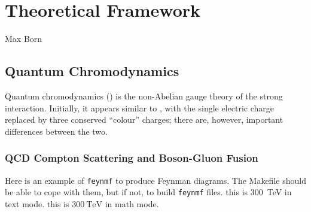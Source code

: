 \chapter{Theoretical Framework}
\label{chap:theory}

{Max Born}

\section{Quantum Chromodynamics}
Quantum chromodynamics (\QCD) is the non-Abelian  gauge theory of the strong interaction.
Initially, it appears similar to \QED, with the single electric charge replaced by three conserved ``colour'' charges; there are, however, important differences between the two.


\subsection{QCD Compton Scattering and Boson-Gluon Fusion}
Here is an example of \texttt{feynmf} to produce Feynman diagrams.
The Makefile should be able to cope with them, but if not, to build \texttt{feynmf} files.
this is \SI{300}{\TeV} in text mode.
this is $\SI{300}{\TeV}$ in math mode.


